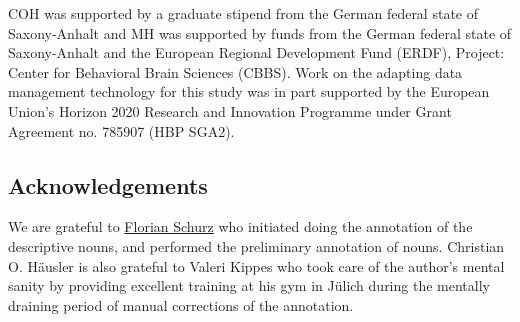 \documentclass[10pt,a4paper,onecolumn]{article}
\begin{document}
COH was supported by a graduate stipend from the German federal state of
Saxony-Anhalt and MH was supported by funds from the German federal state of
Saxony-Anhalt and the European Regional Development Fund (ERDF), Project:
Center for Behavioral Brain Sciences (CBBS). Work on the adapting data
management technology for this study was in part supported by the European
Union’s Horizon 2020 Research and Innovation Programme under Grant Agreement
no. 785907 (HBP SGA2).


\subsection*{Acknowledgements}
We are grateful to \href{www.florianschurz.de}{Florian Schurz} who initiated doing the annotation of the descriptive nouns, and performed the preliminary annotation of nouns. Christian O. Häusler is also grateful to Valeri Kippes who took care of the author's mental sanity by providing excellent training at his gym in Jülich during the mentally draining period of manual corrections of the annotation.

{\small
}
\end{document}
